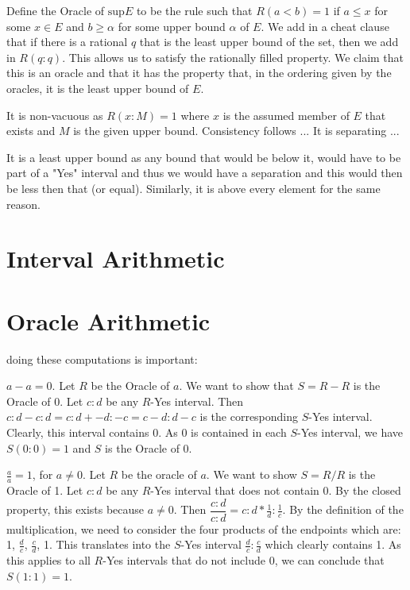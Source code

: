 \documentclass[12pt]{article}
\begin{document}
Define the Oracle of $\mathrm{sup} E$ to be the rule such that $R(a<b) = 1$ if $a \leq x$ for some $x \in E$ and $b \geq \alpha$ for some upper bound $\alpha$ of $E$. We add in a cheat clause that if there is a rational $q$ that is the least upper bound of the set, then we add in $R(q:q)$. This allows us to satisfy the rationally filled property. We claim that this is an oracle and that it has the property that, in the ordering given by the oracles, it is the least upper bound of $E$. 

It is non-vacuous as $R(x:M) = 1$ where $x$ is the assumed member of $E$ that exists and $M$ is the given upper bound. Consistency follows ... It is separating ... 

It is a least upper bound as any bound that would be below it, would have to be part of a "Yes" interval and thus we would have a separation and this would then be less then that (or equal). Similarly, it is above every element for the same reason. 


\section{Interval Arithmetic}

\section{Oracle Arithmetic}

doing these computations is important:

$a-a = 0$. Let $R$ be the Oracle of $a$. We want to show that $S= R-R$ is the Oracle of 0. Let $c:d$ be any $R$-Yes interval. Then $c:d-c:d = c:d+ -d:-c = c-d:d-c$ is the corresponding $S$-Yes interval. Clearly, this interval contains 0. As 0 is contained in each $S$-Yes interval, we have $S(0:0)=1$ and $S$ is the Oracle of 0. 

$\tfrac{a}{a} = 1$, for $a \neq 0$. Let $R$ be the oracle of $a$. We want to show $S=R/R$ is the Oracle of 1. Let $c:d$ be any $R$-Yes interval that does not contain 0. By the closed property, this exists because $a \neq 0$. Then $\dfrac{c:d}{c:d} = c:d * \tfrac{1}{d}:\tfrac{1}{c}$. By the definition of the multiplication, we need to consider the four products of the endpoints which are: 1, $\tfrac{d}{c}$, $\tfrac{c}{d}$, 1. This translates into the $S$-Yes interval $\tfrac{d}{c}:\tfrac{c}{d}$ which clearly contains 1. As this applies to all $R$-Yes intervals that do not include 0, we can conclude that $S(1:1) =1$.
\end{document}
